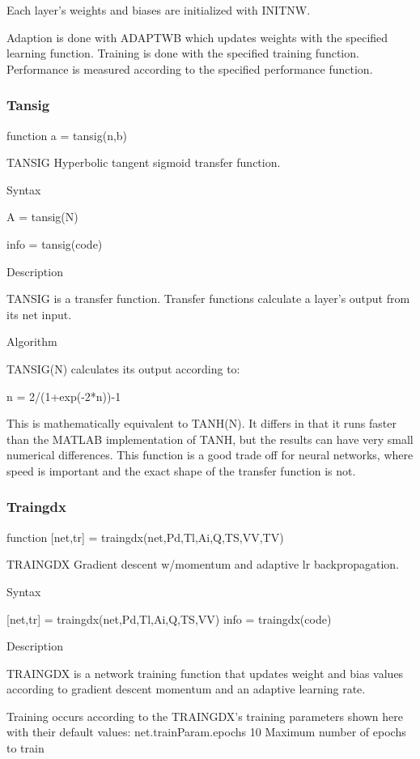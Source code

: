      Each layer's weights and biases are initialized with INITNW.

     Adaption is done with ADAPTWB which updates weights with the
     specified learning function. Training is done with the specified
     training function. Performance is measured according to the specified
     performance function.

\subsubsection{Tansig}
function a = tansig(n,b)

TANSIG Hyperbolic tangent sigmoid transfer function.

   Syntax

     A = tansig(N)

     info = tansig(code)

   Description

     TANSIG is a transfer function.  Transfer functions
     calculate a layer's output from its net input.

   Algorithm

     TANSIG(N) calculates its output according to:

       n = 2/(1+exp(-2*n))-1

     This is mathematically equivalent to TANH(N).  It differs
     in that it runs faster than the MATLAB implementation of TANH,
     but the results can have very small numerical differences.  This
     function is a good trade off for neural networks, where speed is
     important and the exact shape of the transfer function is not.

\subsubsection{Traingdx}
function [net,tr] = traingdx(net,Pd,Tl,Ai,Q,TS,VV,TV)

TRAINGDX Gradient descent w/momentum and adaptive lr
backpropagation.

   Syntax

     [net,tr] = traingdx(net,Pd,Tl,Ai,Q,TS,VV)
     info = traingdx(code)

   Description

     TRAINGDX is a network training function that updates weight and
     bias values according to gradient descent momentum and an
     adaptive learning rate.

     Training occurs according to the TRAINGDX's training parameters
     shown here with their default values:
       net.trainParam.epochs         10  Maximum number of epochs to train

